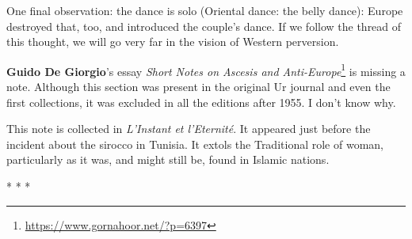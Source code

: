 One final observation: the dance is solo (Oriental dance: the belly dance): Europe destroyed that, too, and introduced the couple's dance. If we follow the thread of this thought, we will go very far in the vision of Western perversion.


\hfill

\textbf{Guido De Giorgio}'s essay \textit{Short Notes on Ascesis and Anti-Europe}\footnote{\url{https://www.gornahoor.net/?p=6397}} is missing a note. Although this section was present in the original Ur journal and even the first collections, it was excluded in all the editions after 1955. I don't know why.

This note is collected in \textit{L'Instant et l'Eternité}. It appeared just before the incident about the sirocco in Tunisia. It extols the Traditional role of woman, particularly as it was, and might still be, found in Islamic nations.




\begin{center}* * *\end{center}

